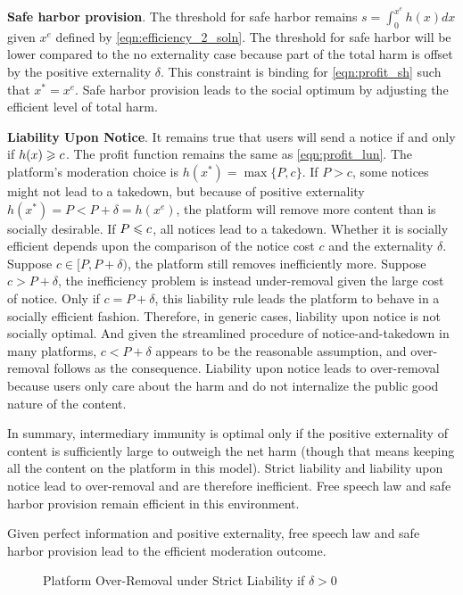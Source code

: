 \textbf{Safe harbor provision}.
The threshold for safe harbor remains $s=\int_0^{x^e}h(x)dx$ given $x^e$ defined by \eqref{eqn:efficiency_2_soln}.
The threshold for safe harbor will be lower compared to the no externality case because part of the total harm is offset by the positive externality $\delta$. This constraint is binding for \eqref{eqn:profit_sh} such that $x^*=x^e$. Safe harbor provision leads to the social optimum by adjusting the efficient level of total harm. 

\textbf{Liability Upon Notice}.
It remains true that users will send a notice if and only if $h(x)\geqslant c$. The profit function remains the same as \eqref{eqn:profit_lun}. The platform's moderation choice is $h(x^*)=\max\{P,c\}$. 
If $P>c$, some notices might not lead to a takedown, but because of positive externality $h(x^*)=P<P+\delta=h(x^e)$, the platform will remove more content than is socially desirable. 
If $P\leqslant c$, all notices lead to a takedown. Whether it is socially efficient depends upon the comparison of the notice cost $c$ and the externality $\delta$. Suppose $c\in[P,P+\delta)$, the platform still removes inefficiently more. Suppose $c>P+\delta$, the inefficiency problem is instead under-removal given the large cost of notice. Only if $c=P+\delta$, this liability rule leads the platform to behave in a socially efficient fashion. 
Therefore, in generic cases, liability upon notice is not socially optimal. 
And given the streamlined procedure of notice-and-takedown in many platforms, $c<P+\delta$ appears to be the reasonable assumption, and over-removal follows as the consequence. 
Liability upon notice leads to over-removal because users only care about the harm and do not internalize the public good nature of the content.

In summary, intermediary immunity is optimal only if the positive externality of content is sufficiently large to outweigh the net harm (though that means keeping all the content on the platform in this model). 
Strict liability and liability upon notice lead to over-removal and are therefore inefficient.
Free speech law and safe harbor provision remain efficient in this environment.
\begin{proposition}
Given perfect information and positive externality, free speech law and safe harbor provision lead to the efficient moderation outcome. 
\end{proposition}

\begin{figure}[h]
    \centering
{}
    \caption{Platform Over-Removal under Strict Liability if $\delta>0$}
    \label{fig:removal}
\end{figure}


